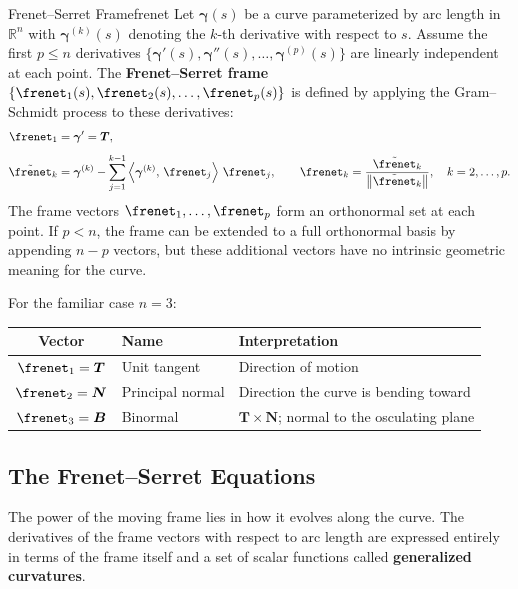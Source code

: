 \documentclass[12pt, openany]{book}
\theoremstyle{plain}
\newcommand{\traj}{\bm{\gamma}}
\newcommand{\Reals}{\mathbb{R}}
\newcommand{\norm}[1]{\left\lVert #1 \right\rVert}
\newcommand{\inner}[2]{\left\langle #1,\, #2 \right\rangle}
\newcommand{\tangent}{\bm{T}}
\newcommand{\normal}{\bm{N}}
\newcommand{\binormal}{\bm{B}}
\begin{document}
\begin{definition}{Frenet--Serret Frame}{frenet}
  Let $\traj(s)$ be a curve parameterized by arc length in $\Reals^n$ with
  $\traj^{(k)}(s)$ denoting the $k$-th derivative with respect to $s$. Assume the
  first $p \leq n$ derivatives $\{\traj'(s), \traj''(s), \ldots, \traj^{(p)}(s)\}$
  are linearly independent at each point. The \textbf{Frenet--Serret frame}
  $\{\frenet_1(s), \frenet_2(s), \ldots, \frenet_p(s)\}$ is defined by
  applying the Gram--Schmidt process to these derivatives:
  \begin{align}
    \frenet_1 &= \traj' = \tangent, \label{eq:frenet_e1} \\[4pt]
    \tilde{\frenet}_k &= \traj^{(k)} - \sum_{j=1}^{k-1}
      \inner{\traj^{(k)}}{\frenet_j}\, \frenet_j, \qquad
    \frenet_k = \frac{\tilde{\frenet}_k}{\norm{\tilde{\frenet}_k}},
    \quad k = 2, \ldots, p. \label{eq:frenet_ek}
  \end{align}
  The frame vectors $\frenet_1, \ldots, \frenet_p$ form an orthonormal set at
  each point. If $p < n$, the frame can be extended to a full orthonormal basis
  by appending $n - p$ vectors, but these additional vectors have no intrinsic
  geometric meaning for the curve.
\end{definition}

For the familiar case $n = 3$:

\begin{center}
\renewcommand{\arraystretch}{1.5}
\begin{tabular}{@{} c l l @{}}
  \toprule
  \textbf{Vector} & \textbf{Name} & \textbf{Interpretation} \\
  \midrule
  $\frenet_1 = \tangent$ & Unit tangent & Direction of motion \\
  $\frenet_2 = \normal$ & Principal normal & Direction the curve is bending toward \\
  $\frenet_3 = \binormal$ & Binormal & $\tangent \times \normal$;
    normal to the osculating plane \\
  \bottomrule
\end{tabular}
\end{center}

\subsection{The Frenet--Serret Equations}

The power of the moving frame lies in how it evolves along the curve. The
derivatives of the frame vectors with respect to arc length are expressed
entirely in terms of the frame itself and a set of scalar functions called
\textbf{generalized curvatures}.
\end{document}
